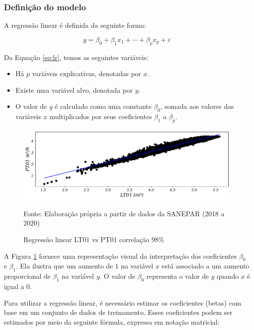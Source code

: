 \subsubsection{Defini\c c\~ ao do modelo}

A regressão linear é definida da seguinte forma:

\begin{equation}
	y = \beta_0 + \beta_1 x_1 + \cdots + \beta_p x_p + \varepsilon \label{eq:lr}
\end{equation}

Da Equação \eqref{eq:lr}, temos as seguintes variáveis:

\begin{itemize}
	\item Há $p$ variáveis explicativas, denotadas por $x$.
	\item Existe uma variável alvo, denotada por $y$.
	\item O valor de $y$ é calculado como uma constante $\beta_0$, somada aos valores das variáveis $x$ multiplicados por seus coeficientes $\beta_1$ a $\beta_p$.
\end{itemize}

\begin{figure}[H]
	\centering
	\caption{Regressão linear LT01 vs PT01 correlação 98\%}
	\label{fig:lr-lt01-m3}
	\includegraphics[width=0.9\linewidth]{"Modelos/Figuras/LR LT01 (m³)"}
	
	Fonte: Elaboração própria a partir de dados da SANEPAR (2018 a 2020)
\end{figure}



A Figura \ref{fig:lr-lt01-m3} fornece uma representação visual da interpretação dos coeficientes $\beta_0$ e $\beta_1$. Ela ilustra que um aumento de $1$ na variável $x$ está associado a um aumento proporcional de $\beta_1$ na variável $y$. O valor de $\beta_0$ representa o valor de $y$ quando $x$ é igual a $0$.

Para utilizar a regressão linear, é necessário estimar os coeficientes (betas) com base em um conjunto de dados de treinamento. Esses coeficientes podem ser estimados por meio da seguinte fórmula, expressa em notação matricial:

